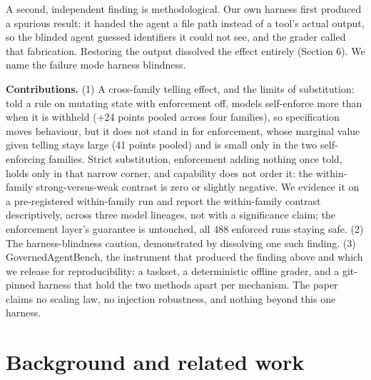 \documentclass{article}
\begin{document}
A second, independent finding is methodological. Our own harness first
produced a spurious result: it handed the agent a file path instead of a
tool's actual output, so the blinded agent guessed identifiers it could
not see, and the grader called that fabrication. Restoring the output
dissolved the effect entirely (Section 6). We name the failure mode
harness blindness.

\textbf{Contributions.} (1) A cross-family telling effect, and the
limits of substitution: told a rule on mutating state with enforcement
off, models self-enforce more than when it is withheld (+24 points
pooled across four families), so specification moves behaviour, but it
does not stand in for enforcement, whose marginal value given telling
stays large (41 points pooled) and is small only in the two
self-enforcing families. Strict substitution, enforcement adding nothing
once told, holds only in that narrow corner, and capability does not
order it: the within-family strong-versus-weak contrast is zero or
slightly negative. We evidence it on a pre-registered within-family run
and report the within-family contrast descriptively, across three model
lineages, not with a significance claim; the enforcement layer's
guarantee is untouched, all 488 enforced runs staying safe. (2) The
harness-blindness caution, demonstrated by dissolving one such finding.
(3) GovernedAgentBench, the instrument that produced the finding above
and which we release for reproducibility: a taskset, a deterministic
offline grader, and a git-pinned harness that hold the two methods apart
per mechanism. The paper claims no scaling law, no injection robustness,
and nothing beyond this one harness.

\section{Background and related work}\label{background-and-related-work}
\end{document}
